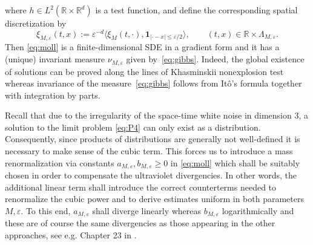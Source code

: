\documentclass[a4paper,11pt]{article}
\newcommand{\assign}{:=}
\newcommand{\cdummy}{\cdot}
\newcommand{\tmmathbf}[1]{\ensuremath{\boldsymbol{#1}}}
\numberwithin{equation}{section}
\begin{document}
where $h\in L^{2}(\mathbb R\times\mathbb R^{d})$ is a test function, and define the corresponding spatial discretization by
\[ \xi_{M, \varepsilon} (t, x) \assign \varepsilon^{- d} \langle \xi_M (t,
   \cdummy), \tmmathbf{1}_{| \cdummy - x | \leqslant \varepsilon / 2} \rangle,
   \qquad (t, x) \in \mathbb{R} \times \Lambda_{M, \varepsilon} . \]
Then {\eqref{eq:moll}} is a finite-dimensional SDE in a gradient form and it has a (unique) invariant measure $\nu_{M, \varepsilon}$ given by~\eqref{eq:gibbs}. Indeed, the global existence of solutions can be proved along the lines of Khasminskii nonexplosion test \cite[Theorem 3.5]{khasminskii2011stochastic} whereas invariance of the measure~\eqref{eq:gibbs} follows from  It\^o's formula together with integration by parts.


Recall that due to the irregularity of the
space-time white noise in dimension $3$, a solution to the limit problem
{\eqref{eq:P4}} can only exist as a distribution. Consequently, since products
of distributions are generally not well-defined it is necessary to make sense
of the cubic term. This forces us to introduce a mass renormalization via
constants $a_{M, \varepsilon}, b_{M, \varepsilon} \geqslant 0$ in
{\eqref{eq:moll}} which shall be suitably chosen in order to compensate the
ultraviolet divergencies. In other words, the additional linear term shall
introduce the correct counterterms needed to renormalize the cubic power and
to derive estimates uniform in both parameters $M, \varepsilon$. To this end,
$a_{M, \varepsilon}$ shall diverge linearly whereas $b_{M, \varepsilon}$
logarithmically and these are of course the same divergencies as those
appearing in the other approaches, see e.g. Chapter 23 in {\cite{MR887102}}.
\end{document}
